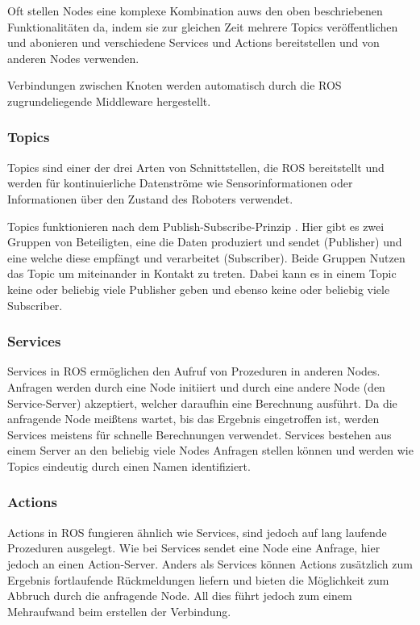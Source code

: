 Oft stellen Nodes eine komplexe Kombination auws den oben beschriebenen Funktionalitäten da, indem sie zur gleichen Zeit mehrere Topics veröffentlichen und abonieren und verschiedene Services und Actions bereitstellen und von anderen Nodes verwenden.

Verbindungen zwischen Knoten werden automatisch durch die \ac{ROS} zugrundeliegende Middleware hergestellt.

\subsubsection*{Topics}

Topics sind einer der drei Arten von Schnittstellen, die \ac{ROS} bereitstellt und werden für kontinuierliche Datenströme wie Sensorinformationen oder Informationen über den Zustand des Roboters verwendet.

Topics funktionieren nach dem Publish-Subscribe-Prinzip \cite{baldoni2007}.
Hier gibt es zwei Gruppen von Beteiligten, eine die Daten produziert und sendet (Publisher) und eine welche diese empfängt und verarbeitet (Subscriber). Beide Gruppen Nutzen das Topic um miteinander in Kontakt zu treten. Dabei kann es in einem Topic keine oder beliebig viele Publisher geben und ebenso keine oder beliebig viele Subscriber.

\subsubsection*{Services}

Services in \ac{ROS} ermöglichen den Aufruf von Prozeduren in anderen Nodes. Anfragen werden durch eine Node initiiert und durch eine andere Node (den Service-Server) akzeptiert, welcher daraufhin eine Berechnung ausführt. Da die anfragende Node meißtens wartet, bis das Ergebnis eingetroffen ist, werden Services meistens für schnelle Berechnungen verwendet. Services bestehen aus einem Server an den beliebig viele Nodes Anfragen stellen können und werden wie Topics eindeutig durch einen Namen identifiziert. 

\subsubsection*{Actions}

Actions in \ac{ROS} fungieren ähnlich wie Services, sind jedoch auf lang laufende Prozeduren ausgelegt. Wie bei Services sendet eine Node eine Anfrage, hier jedoch an einen Action-Server. Anders als Services können Actions zusätzlich zum Ergebnis fortlaufende Rückmeldungen liefern und bieten die Möglichkeit zum Abbruch durch die anfragende Node. All dies führt jedoch zum einem Mehraufwand beim  erstellen der Verbindung.

